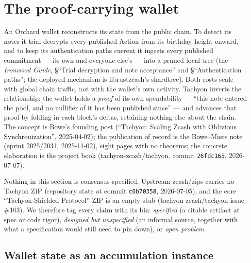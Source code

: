 \documentclass[11pt,a4paper]{article}
\theoremstyle{definition}
\begin{document}
\section{The proof-carrying wallet}\label{sec:tachyon-architecture}

An Orchard wallet reconstructs its state from the public chain. To detect its
notes it trial-decrypts every published Action from its birthday height
onward, and to keep its authentication paths current it ingests every
published commitment --- its own and everyone else's --- into a pruned local
tree (the \emph{Ironwood Guide}, \S``Trial decryption and note acceptance''
and \S``Authentication paths''; the deployed
mechanism is librustzcash's \textsf{shardtree}). Both costs scale with global
chain traffic, not with the wallet's own activity. Tachyon inverts the
relationship: the wallet holds a \emph{proof} of its own spendability ---
``this note entered the pool, and no nullifier of it has been published
since'' --- and advances that proof by folding in each block's deltas,
retaining nothing else about the chain. The concept is Bowe's founding post
(``Tachyon: Scaling Zcash with Oblivious Synchronization'', 2025-04-02); the
publication of record is the Bowe--Miers note (eprint 2025/2031, 2025-11-02),
eight pages with no theorems; the concrete elaboration is the project book
(tachyon-zcash/tachyon, commit \texttt{26fdc165}, 2026-07-07).

Nothing in this section is consensus-specified. Upstream zcash/zips carries
no Tachyon ZIP (repository state at commit \texttt{c6b70358}, 2026-07-05),
and the core ``Tachyon Shielded Protocol'' ZIP is an empty stub
(tachyon-zcash/tachyon issue \#103). We therefore tag every claim with its
bin: \emph{specified} (a citable artifact at spec or code rigor),
\emph{designed but unspecified} (an informal source, together with what a
specification would still need to pin down), or \emph{open problem}.

\subsection{Wallet state as an accumulation instance}\label{sec:tachyon-fold}
\end{document}
